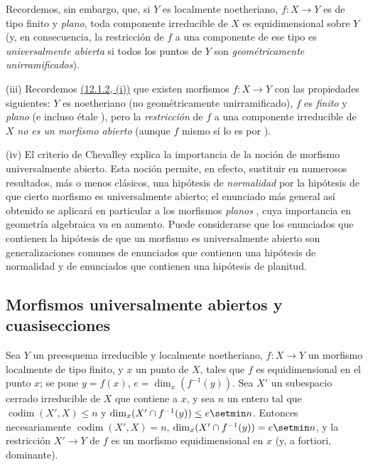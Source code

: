 \begin{remarks}[14.4.10]
Recordemos, sin embargo,  que, si $Y$ es localmente noetheriano, $f:X\to Y$ es de tipo finito y \emph{plano}, toda componente irreducible de $X$ es equidimensional sobre $Y$ (y, en consecuencia, la restricción de $f$ a una componente de ese tipo es \emph{universalmente abierta} si todos los puntos de $Y$ son \emph{geométricamente unirramificados}).

(iii) Recordemos {\hyperlink{ega4.c04.item.12-1-2}{(12.1.2, (i))}} que existen morfismos $f:X\to Y$ con las propiedades siguientes: $Y$ es noetheriano (no geométricamente unirramificado), $f$ es \emph{finito} y \emph{plano} (e incluso \'etale ), pero la \emph{restricción} de $f$ a una componente irreducible de $X$ \emph{no es un morfismo abierto} (aunque $f$ mismo sí lo es por ).

(iv) El criterio de Chevalley  explica la importancia de la noción de morfismo universalmente abierto.
Esta noción permite, en efecto, sustituir en numerosos resultados, más o menos clásicos, una hipótesis de \emph{normalidad} por la hipótesis de que cierto morfismo es universalmente abierto; el enunciado más general
así obtenido se aplicará en particular a los morfismos \emph{planos} , cuya importancia en geometría algebraica va en aumento.
Puede considerarse que los enunciados que contienen la hipótesis de que un morfismo es universalmente abierto son generalizaciones comunes de enunciados que contienen una hipótesis de normalidad y de enunciados que contienen una hipótesis de planitud.
\end{remarks}


\subsection{Morfismos universalmente abiertos y cuasisecciones}
\label{subsection:IV.14.5}
\label{IV.14.5}

\begin{lemma}[14.5.1]
\label{IV.14.5.1}
Sea $Y$ un preesquema irreducible y localmente noetheriano, $f:X\to Y$ un morfismo localmente de tipo finito, y $x$ un punto de $X$, tales que $f$ es equidimensional  en el punto $x$; se pone $y=f(x)$, $e=\dim_x(f^{-1}(y))$.
Sea $X'$ un subespacio cerrado irreducible de $X$ que contiene a $x$, y sea $n$ un entero tal que $\operatorname{codim}(X',X)\leq n$ y $\dim_x(X'\cap f^{-1}(y))\leq e\setmin n$.
Entonces necesariamente $\operatorname{codim}(X',X)=n$, $\dim_x(X'\cap f^{-1}(y))=e\setmin n$, y la restricción $X'\to Y$ de $f$ es un morfismo equidimensional en $x$ (y, \textup{a fortiori}, dominante).
\end{lemma}


